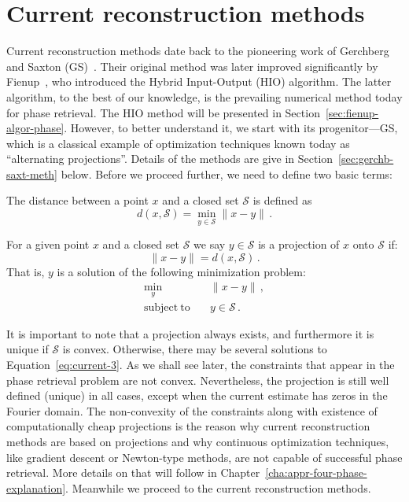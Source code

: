 
\chapter{Current reconstruction methods}
\label{cha:curr-reconstr-meth}
Current reconstruction methods date back to the pioneering work of
Gerchberg and Saxton (GS)~. Their original
method was later improved significantly by Fienup~,
who introduced the Hybrid Input-Output (HIO) algorithm. The latter
algorithm, to the best of our knowledge, is the prevailing
numerical method today for phase retrieval. The HIO method will be
presented in Section~\ref{sec:fienup-algor-phase}. However, to better
understand it, we start with its progenitor---GS, which is a classical
example of optimization techniques known today as ``alternating
projections''.  Details of the methods are give in
Section~\ref{sec:gerchb-saxt-meth} below. Before we proceed further,
we need to define two basic terms:
\begin{defn}
  \label{def:current-1}
  The distance between a point $x$ and a closed set $\mathcal{S}$ is
  defined as
  \begin{equation}
    \label{eq:current-1}
    d(x,\mathcal{S}) = \min_{y\in\mathcal{S}}\|x - y\|\,. 
  \end{equation}
\end{defn}

\begin{defn}
  \label{def:current-2}
  For a given point $x$ and a closed set $\mathcal{S}$ we say
  $y\in{\mathcal{S}}$ is a projection of $x$ onto $\mathcal{S}$ if:
  \begin{equation}
    \label{eq:current-2}
    \|x - y\| = d(x, \mathcal{S})\,. 
  \end{equation}
  That is, $y$ is a solution of the following minimization problem:
  \begin{equation}
  \label{eq:current-3}
  \begin{split}
    \min_{y} &\quad \|x-y\|\,,  \\
    \mathrm{subject\ to} &\quad y\in\mathcal{S} \,. 
  \end{split}
\end{equation}
\end{defn}
It is important to note that a projection always exists, and
furthermore it is unique if $\mathcal{S}$ is convex. Otherwise, there
may be several solutions to Equation~\eqref{eq:current-3}. As we shall
see later, the constraints that appear in the phase retrieval problem
are not convex. Nevertheless, the projection is still well defined
(unique) in
all cases, except when the current estimate has zeros in the Fourier
domain.  The non-convexity of the constraints along with existence of
computationally cheap projections is the reason why current
reconstruction methods are based on projections and why continuous
optimization techniques, like gradient descent or Newton-type methods,
are not capable of successful phase retrieval. More details on that
will follow in Chapter~\ref{cha:appr-four-phase-explanation}.
Meanwhile we proceed to the current reconstruction methods.

